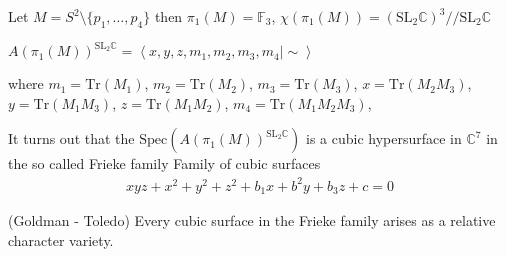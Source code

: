 Let $ M = S^2 \setminus \{p_1, \dots, p_4 \} $ 
then $ \pi_1 (M) = \mathbb{F} _3 $, $ \chi(\pi_1 ( M) ) = ( \mathrm{SL}_2 \mathbb{C} ) ^3 // \mathrm{SL}_2 \mathbb{C} $

$ A(\pi_1 ( M) ) ^{\mathrm{SL}_2 \mathbb{C} }  = \left<x,y,z, m_1, m_2, m_3, m_4 | \sim \right>$ 

where 
$ m_{1} = \mathrm{Tr}(M_{1} ) $, 
$ m_{2} = \mathrm{Tr}(M_{2} ) $, 
$ m_{3} = \mathrm{Tr}(M_{3} ) $, 
$ x = \mathrm{Tr}(M_{2}M_{3} ) $, 
$ y = \mathrm{Tr}(M_{1}M_{3} ) $, 
$ z = \mathrm{Tr}(M_{1}M_{2} ) $, 
$ m_{4} = \mathrm{Tr}(M_{1}M_{2}M_{3} ) $, 


It turns out that the
$ \mathrm{Spec}(A(\pi_1(M))^{\mathrm{SL}_2 \mathbb{C} } ) $ is a cubic hypersurface in $\mathbb{C} ^7 $
in the so called Frieke family 
Family of cubic surfaces 
\begin{align}
    xyz + x^2 + y^2 + z^2 + b_1 x + b^2 y + b_3 z +c = 0 
\end{align}

\begin{theorem}
    (Goldman - Toledo) 
    Every cubic surface in the Frieke family arises as a relative character variety.
\end{theorem}







 


